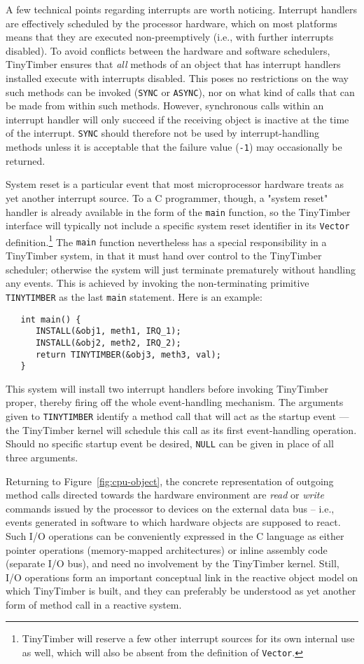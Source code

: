 \documentclass[12pt]{article}
\begin{document}
A few technical points regarding interrupts are worth noticing. Interrupt handlers are effectively scheduled by the processor hardware, which on most platforms means that they are executed non-preemptively (i.e., with further interrupts disabled). To avoid conflicts between the hardware and software schedulers, TinyTimber ensures that {\em all} methods of an object that has interrupt handlers installed execute with interrupts disabled. This poses no restrictions on the way such methods can be invoked ({\tt SYNC} or {\tt ASYNC}), nor on what kind of calls that can be made from within such methods. However, synchronous calls within an interrupt handler will only succeed if the receiving object is inactive at the time of the interrupt.  {\tt SYNC} should therefore not be used by interrupt-handling methods unless it is acceptable that the failure value ({\tt -1}) may occasionally be returned. 

System reset is a particular event that most microprocessor hardware treats as yet another interrupt source. To a C programmer, though, a "system reset" handler is already available in the form of the {\tt main} function, so the TinyTimber interface will typically not include a specific system reset identifier in its {\tt Vector} definition.\footnote{TinyTimber will reserve a few other interrupt sources for its own internal use as well, which will also be absent from the definition of {\tt Vector}.} The {\tt main} function nevertheless has a special responsibility in a TinyTimber system, in that it must hand over control to the TinyTimber scheduler; otherwise the system will just terminate prematurely without handling any events. This is achieved by invoking the non-terminating primitive {\tt TINYTIMBER} as the last {\tt main} statement. Here is an example:
\begin{verbatim}
   int main() {
      INSTALL(&obj1, meth1, IRQ_1);
      INSTALL(&obj2, meth2, IRQ_2);
      return TINYTIMBER(&obj3, meth3, val);
   }
\end{verbatim}
This system will install two interrupt handlers before invoking TinyTimber proper, thereby firing off the whole event-handling mechanism. The arguments given to {\tt TINYTIMBER} identify a method call that will act as the startup event --- the TinyTimber kernel will schedule this  call as its first event-handling operation. Should no specific startup event be desired, {\tt NULL} can be given in place of all three arguments.

Returning to Figure~\ref{fig:cpu-object}, the concrete representation of outgoing method calls directed towards the hardware environment are {\em read} or {\em write} commands issued by the processor to devices on the external data bus -- i.e., events generated in software to which hardware objects are supposed to react.  Such I/O operations can be conveniently expressed in the C language as either pointer operations (memory-mapped architectures) or inline assembly code (separate I/O bus), and need no involvement by the TinyTimber kernel.  Still, I/O operations form an important conceptual link in the reactive object model on which TinyTimber is built, and they can preferably be understood as yet another form of method call in a reactive system.
\end{document}
